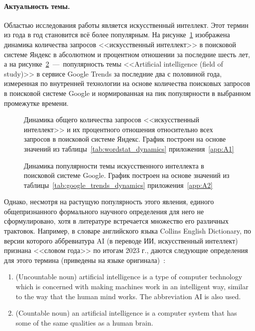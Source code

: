 \paragraph{\indent Актуальность темы.} Областью исследования работы является искусственный интеллект. Этот термин из года в год становится всё более популярным. На рисунке~\cref{fig:wordstat_dynamics} изображена динамика количества запросов <<искусственный интеллект>> в поисковой системе Яндекс в абсолютном и процентном отношении за последние шесть лет, а на рисунке~\cref{fig:google_trends_dynamics}~---~популярность темы <<Artificial intelligence (field of study)>> в сервисе Google Trends за последние два с половиной года, измеренная по внутренней технологии на основе количества поисковых запросов в поисковой системе Google и нормированная на пик популярности в выбранном промежутке времени.

\begin{figure}[b]
    \caption{Динамика общего количества запросов <<искусственный интеллект>> и их процентного отношения относительно всех запросов в поисковой системе Яндекс. График построен на основе значений из таблицы~\cref{tab:wordstat_dynamics} приложения~\cref{app:A1}}\label{fig:wordstat_dynamics}
\end{figure}

\begin{figure}[t]
    \caption{Динамика популярности темы искусственного интеллекта в поисковой системе Google. График построен на основе значений из таблицы~\cref{tab:google_trends_dynamics} приложения~\cref{app:A2}}\label{fig:google_trends_dynamics}
\end{figure}

Однако, несмотря на растущую популярность этого явления, единого общепризнанного формального научного определения для него не сформулировано, хотя в литературе встречается множество его различных трактовок. Например, в словаре английского языка Collins English Dictionary, по версии которого аббревиатура AI (в переводе ИИ, искусственный интеллект) признана <<словом года>> по итогам 2023 г., даются следующие определения для этого термина (приведены на языке оригинала)~\cite{collins}:
\begin{enumerate}
    \item (Uncountable noun) artificial intelligence is a type of computer technology which is concerned with making machines work in an intelligent way, similar to the way that the human mind works. The abbreviation AI is also used.
    \item (Countable noun) an artificial intelligence is a computer system that has some of the same qualities as a human brain.
\end{enumerate}

